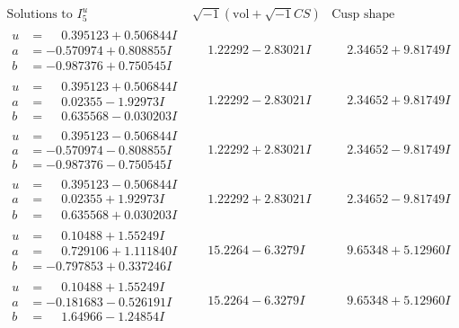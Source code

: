 \documentclass[1p]{elsarticle_modified}
\theoremstyle{definition}
\newcommand{\I}{\sqrt{-1}}
\begin{document}
$$\begin{array}{c|c|c}  
\text{Solutions to }I^u_{5}& \I (\text{vol} + \sqrt{-1}CS) & \text{Cusp shape}\\
 \hline 
\begin{aligned}
u &= \phantom{-}0.395123 + 0.506844 I \\
a &= -0.570974 + 0.808855 I \\
b &= -0.987376 + 0.750545 I\end{aligned}
 & \phantom{-}1.22292 - 2.83021 I & \phantom{-}2.34652 + 9.81749 I \\ \hline\begin{aligned}
u &= \phantom{-}0.395123 + 0.506844 I \\
a &= \phantom{-}0.02355 - 1.92973 I \\
b &= \phantom{-}0.635568 - 0.030203 I\end{aligned}
 & \phantom{-}1.22292 - 2.83021 I & \phantom{-}2.34652 + 9.81749 I \\ \hline\begin{aligned}
u &= \phantom{-}0.395123 - 0.506844 I \\
a &= -0.570974 - 0.808855 I \\
b &= -0.987376 - 0.750545 I\end{aligned}
 & \phantom{-}1.22292 + 2.83021 I & \phantom{-}2.34652 - 9.81749 I \\ \hline\begin{aligned}
u &= \phantom{-}0.395123 - 0.506844 I \\
a &= \phantom{-}0.02355 + 1.92973 I \\
b &= \phantom{-}0.635568 + 0.030203 I\end{aligned}
 & \phantom{-}1.22292 + 2.83021 I & \phantom{-}2.34652 - 9.81749 I \\ \hline\begin{aligned}
u &= \phantom{-}0.10488 + 1.55249 I \\
a &= \phantom{-}0.729106 + 1.111840 I \\
b &= -0.797853 + 0.337246 I\end{aligned}
 & \phantom{-}15.2264 - 6.3279 I & \phantom{-}9.65348 + 5.12960 I \\ \hline\begin{aligned}
u &= \phantom{-}0.10488 + 1.55249 I \\
a &= -0.181683 - 0.526191 I \\
b &= \phantom{-}1.64966 - 1.24854 I\end{aligned}
 & \phantom{-}15.2264 - 6.3279 I & \phantom{-}9.65348 + 5.12960 I \\ \hline\begin{aligned}

\end{aligned}
\end{array}$$
\end{document}
